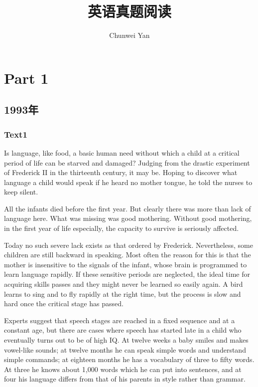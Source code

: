 \documentclass[a4paper]{article}
\author{Chunwei Yan}
\title{英语真题阅读}
\begin{document}
\maketitle
\tableofcontents
\setcounter{tocdepth}{4}

\section{Part 1}
\subsection{1993年}
\subsubsection{Text1}

\par
Is language, like food, a basic human need without which a child at a critical period of life can be starved and damaged? Judging from the drastic experiment of Frederick II in the thirteenth century, it may be. Hoping to discover what language a child would speak if he heard no mother tongue, he told the nurses to keep silent.

\par
All the infants died before the first year. But clearly there was more than lack of language here. What was missing was good mothering. Without good mothering, in the first year of life especially, the capacity to survive is seriously affected.

\par
Today no such severe lack exists as that ordered by Frederick. Nevertheless, some children are still backward in speaking. Most often the reason for this is that the mother is insensitive to the signals of the infant, whose brain is programmed to learn language rapidly. If these sensitive periods are neglected, the ideal time for acquiring skills passes and they might never be learned so easily again. A bird learns to sing and to fly rapidly at the right time, but the process is slow and hard once the critical stage has passed.

\par
Experts suggest that speech stages are reached in a fixed sequence and at a constant age, but there are cases where speech has started late in a child who eventually turns out to be of high IQ. At twelve weeks a baby smiles and makes vowel-like sounds; at twelve months he can speak simple words and understand simple commands; at eighteen months he has a vocabulary of three to fifty words. At three he knows about 1,000 words which he can put into sentences, and at four his language differs from that of his parents in style rather than grammar.
\end{document}
